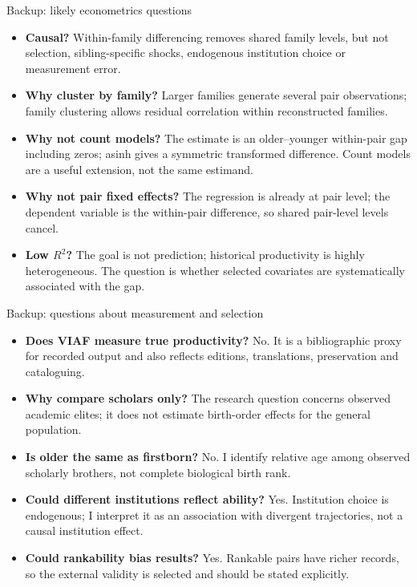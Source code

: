 \documentclass[aspectratio=169,10pt]{beamer}
\begin{document}
\begin{frame}{Backup: likely econometrics questions}
\begin{itemize}\setlength\itemsep{0.35em}
\item \textbf{Causal?} Within-family differencing removes shared family levels, but not selection, sibling-specific shocks, endogenous institution choice or measurement error.
\item \textbf{Why cluster by family?} Larger families generate several pair observations; family clustering allows residual correlation within reconstructed families.
\item \textbf{Why not count models?} The estimate is an older--younger within-pair gap including zeros; asinh gives a symmetric transformed difference. Count models are a useful extension, not the same estimand.
\item \textbf{Why not pair fixed effects?} The regression is already at pair level; the dependent variable is the within-pair difference, so shared pair-level levels cancel.
\item \textbf{Low $R^2$?} The goal is not prediction; historical productivity is highly heterogeneous. The question is whether selected covariates are systematically associated with the gap.
\end{itemize}
\end{frame}

\begin{frame}{Backup: questions about measurement and selection}
\begin{itemize}\setlength\itemsep{0.35em}
\item \textbf{Does VIAF measure true productivity?} No. It is a bibliographic proxy for recorded output and also reflects editions, translations, preservation and cataloguing.
\item \textbf{Why compare scholars only?} The research question concerns observed academic elites; it does not estimate birth-order effects for the general population.
\item \textbf{Is older the same as firstborn?} No. I identify relative age among observed scholarly brothers, not complete biological birth rank.
\item \textbf{Could different institutions reflect ability?} Yes. Institution choice is endogenous; I interpret it as an association with divergent trajectories, not a causal institution effect.
\item \textbf{Could rankability bias results?} Yes. Rankable pairs have richer records, so the external validity is selected and should be stated explicitly.
\end{itemize}
\end{frame}
\end{document}
